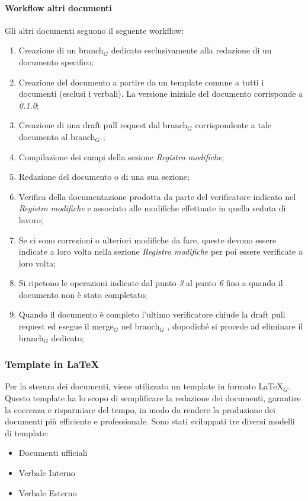     \paragraph{Workflow altri documenti}
    Gli altri documenti seguono il seguente workflow:
    \begin{enumerate}
        \item Creazione di un branch$_G$ dedicato esclusivamente alla redazione di un documento specifico;
        \item Creazione del documento a partire da un template comune a tutti i documenti (esclusi i verbali). La versione iniziale del documento corrisponde a \textit{0.1.0};
        \item Creazione di una draft pull request dal branch$_G$ corrispondente a tale documento al branch$_G$ ;
        \item Compilazione dei campi della sezione \textit{Registro modifiche};
        \item Redazione del documento o di una sua sezione;
        \item Verifica della documentazione prodotta da parte del verificatore indicato nel \textit{Registro modifiche} e associato alle modifiche effettuate in quella seduta di lavoro;
        \item Se ci sono correzioni o ulteriori modifiche da fare, queste 
        devono essere indicate a loro volta nella sezione \textit{Registro modifiche} per poi essere verificate a loro volta;
        \item Si ripetono le operazioni indicate dal punto \textit{3} al punto \textit{6} fino a quando il documento non è stato completato;
        \item Quando il documento è completo l'ultimo verificatore 
        chiude la draft pull request ed esegue il merge$_G$ nel branch$_G$ , dopodiché si procede ad eliminare il branch$_G$ dedicato;
    \end{enumerate}

\subsubsection{Template in \LaTeX}
Per la stesura dei documenti, viene utilizzato un template in formato \LaTeX$_G$. Questo template ha lo scopo di semplificare la redazione dei documenti, garantire la coerenza e risparmiare del tempo, in modo da rendere la produzione dei documenti più efficiente e professionale. Sono stati sviluppati tre diversi modelli di template:
\begin{itemize}
    \item Documenti ufficiali
    \item Verbale Interno
    \item Verbale Esterno
\end{itemize}

